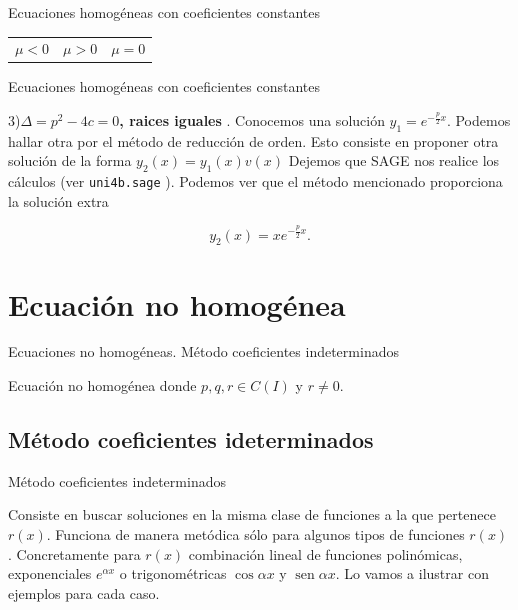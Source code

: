 \documentclass[handout,hyperref={colorlinks=true}]{beamer}
\newcommand{\nl}{\onslide<+-> }
\DeclareMathOperator{\sen}{sen}
\begin{document}
\begin{frame}{Ecuaciones homogéneas con coeficientes constantes}
\begin{tabular}{c c c}
 $\mu<0$ & $\mu>0$ & $\mu=0$\\
\end{tabular}




\end{frame}


\begin{frame}{Ecuaciones homogéneas con coeficientes constantes}


3)\textbf{$\boxed{\Delta=p^2-4c=0}$, raices iguales }. Conocemos una solución $\boxed{y_1=e^{-\frac{p}{2}x}}$. Podemos hallar otra
por el método de reducción de orden. Esto consiste en proponer otra solución de la forma $y_2(x)=y_1(x)v(x)$ Dejemos que SAGE nos realice los
cálculos (ver \texttt{uni4b.sage} ). Podemos ver que el método mencionado proporciona la solución extra 

\[\boxed{y_2(x)=xe^{-\frac{p}{2}x}}.\]


\end{frame}


\section{Ecuación no homogénea}

\begin{frame}{Ecuaciones no homogéneas. Método coeficientes indeterminados}
\nl \begin{block}{Ecuación no homogénea}
donde $p,q,r \in C(I)$ y $r\neq 0$.
 \end{block}

\subsection{Método coeficientes ideterminados}

\nl \begin{block}{Método coeficientes indeterminados}
 
Consiste en buscar soluciones en la misma clase de funciones a la que pertenece $r(x)$. Funciona de manera metódica sólo para algunos tipos de funciones $r(x)$. 
Concretamente para $r(x)$ combinación lineal de funciones polinómicas, exponenciales $e^{\alpha x}$ o trigonométricas $\cos \alpha x$ y $\sen \alpha x$. 
Lo vamos a ilustrar con ejemplos para cada caso.
 \end{block}
 \end{frame}

 
 
\end{document}

